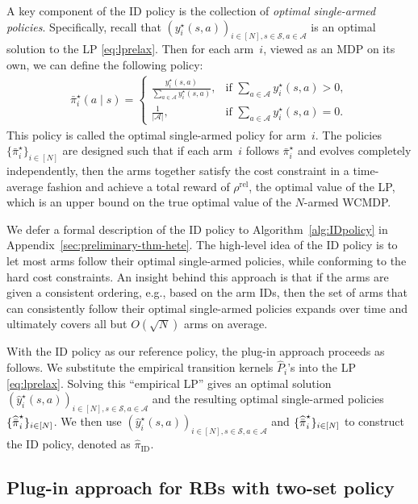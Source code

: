 \documentclass[mnsc,nonblindrev]{informs3}
\newcommand{\pihid}{\widehat{\pi}_{\mathrm{ID}}}
\newcommand{\pihbst}{\widehat{\Bar{\pi}}^\star}
\newcommand{\yhst}{\widehat{y}^\star}
\newcommand{\rhorel}{\rho^{\mathrm{rel}}}
\newcommand{\States}{\mathcal{S}}
\newcommand{\Actions}{\mathcal{A}}
\begin{document}
A key component of the ID policy is the collection of \emph{optimal single-armed policies}.
Specifically, recall that $(y_i^\star(s,a))_{i\in[N],s\in\States,a\in\Actions}$ is an optimal solution to the LP \eqref{eq:lprelax}.
Then for each arm~$i$, viewed as an MDP on its own, we can define the following policy:
\vspace{-0.05cm}\begin{align}\label{def-pibst}
    \bar{\pi}_i^\star(a \mid s) =
\begin{cases}
\frac{y_i^\star(s,a)}{\sum_{a \in \mathcal{A}} y_i^\star(s,a)}, & \text{if } \sum_{a \in \mathcal{A}} y_i^\star(s,a) > 0, \\
\frac{1}{|\mathcal{A}|}, & \text{if } \sum_{a \in \mathcal{A}} y_i^\star(s,a) = 0.
\end{cases}
\end{align}
This policy is called the optimal single-armed policy for arm~$i$.
The policies $\{\bar{\pi}_i^\star\}_{i\in[N]}$ are designed such that if each arm~$i$ follows $\bar{\pi}_i^\star$ and evolves completely independently, then the arms together satisfy the cost constraint in a time-average fashion and achieve a total reward of  $\rhorel$, the optimal value of the LP, which is an upper bound on the true optimal value of the $N$-armed WCMDP.


We defer a formal description of the ID policy to Algorithm~\ref{alg:IDpolicy} in Appendix~\ref{sec:preliminary-thm-hete}.
The high-level idea of the ID policy is to let most arms follow their optimal single-armed policies, while conforming to the hard cost constraints.
An insight behind this approach is that if the arms are given a consistent ordering, e.g., based on the arm IDs, then the set of arms that can consistently follow their optimal single-armed policies expands over time and ultimately covers all but $O(\sqrt{N})$ arms on average.

With the ID policy as our reference policy, the plug-in approach proceeds as follows.
We substitute the empirical transition kernels $\widehat P_i$'s into the LP \eqref{eq:lprelax}.
Solving this ``empirical LP'' gives an optimal solution $(\yhst_i(s,a))_{i\in[N],s\in\States,a\in\Actions}$ and the resulting optimal single-armed policies $\{\pihbst_i\}_{i\in[N]}$.
We then use $(\yhst_i(s,a))_{i\in[N],s\in\States,a\in\Actions}$ and $\{\pihbst_i\}_{i\in[N]}$ to construct the ID policy, denoted as $\pihid$.

\subsection{Plug-in approach for RBs with two-set policy}
\end{document}
